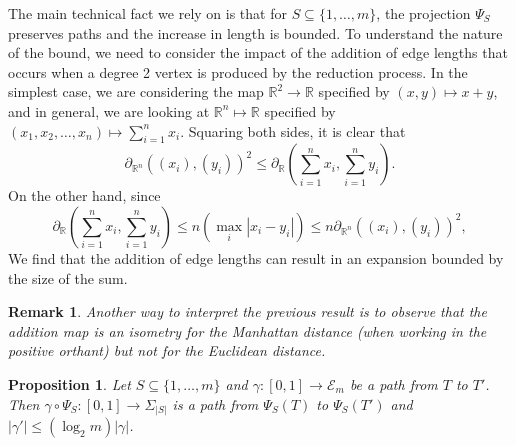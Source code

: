 \documentclass[a4paper,11pt]{article}
\newtheorem{proposition}[theorem]{Proposition}
\newtheorem{remark}[theorem]{Remark}
\newcommand{\aE}{\mathcal{E}}
\begin{document}
The main technical fact we rely on is that for $S \subseteq \{1,\ldots,m\}$, the projection $\Psi_S$ preserves paths and the increase in length is bounded.
To understand the nature of the bound, we need to consider the impact of the addition of edge lengths that occurs when a degree 2 vertex is produced by the reduction process.
In the simplest case, we are considering the map $\mathbb{R}^2 \to \mathbb{R}$ specified by $(x,y) \mapsto x+y$, and in general, we are looking at $\mathbb{R}^n \mapsto \mathbb{R}$ specified by $(x_1, x_2, \ldots, x_n) \mapsto \sum_{i=1}^n x_i$.
Squaring both sides, it is clear that
\[
\partial_{\mathbb{R}^n}((x_i), (y_i))^2 \leq \partial_{\mathbb{R}}(\sum_{i=1}^n x_i, \sum_{i=1}^n y_i).
\]
On the other hand, since 
\[
\partial_{\mathbb{R}}(\sum_{i=1}^n x_i, \sum_{i=1}^n y_i) \leq n(\max_i |x_i - y_i|) \leq n \partial_{\mathbb{R}^n}((x_i), (y_i))^2,
\]
We find that the addition of edge lengths can result in an expansion bounded by the size of the sum.

\begin{remark}
Another way to interpret the previous result is to observe that the addition map is an isometry for the Manhattan distance (when working in the positive orthant) but not for the Euclidean distance.
\end{remark}

\begin{proposition}\label{prop:projcont}
Let $S \subseteq \{1,\ldots,m\}$ and $\gamma \colon [0,1] \to \aE_m$ be a path from $T$ to $T'$.
Then $\gamma \circ \Psi_S \colon [0,1] \to \Sigma_{|S|}$ is a path from $\Psi_S(T)$ to $\Psi_S(T')$ and $|\gamma'| \leq (\log_2 m) |\gamma|$.
\end{proposition}
\end{document}

